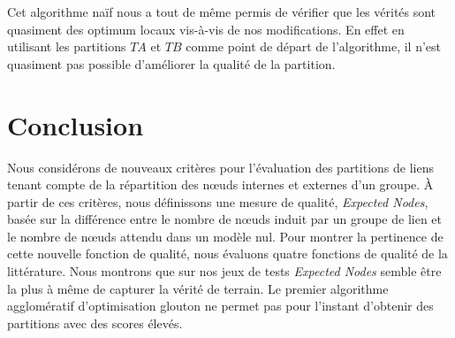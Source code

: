 Cet algorithme naïf nous a tout de même permis de vérifier que les vérités sont quasiment des optimum locaux vis-à-vis de nos modifications.
En effet en utilisant les partitions $TA$ et $TB$ comme point de départ de l'algorithme, il n'est quasiment pas possible d'améliorer la qualité de la partition.

\section{Conclusion}

Nous considérons de nouveaux critères pour l'évaluation des partitions de liens tenant compte de la répartition des n\oe uds internes et externes d'un groupe.
\`A partir de ces critères, nous définissons une mesure de qualité, \emph{Expected Nodes}, basée sur la différence entre le nombre de n\oe uds induit par un groupe de lien et le nombre de n\oe uds attendu dans un modèle nul.
Pour montrer la pertinence de cette nouvelle fonction de qualité, nous évaluons quatre fonctions de qualité de la littérature.
Nous montrons que sur nos jeux de tests \emph{Expected Nodes} semble être la plus à même de capturer la vérité de terrain.
Le premier algorithme agglomératif d'optimisation glouton ne permet pas pour l'instant d'obtenir des partitions avec des scores élevés.


